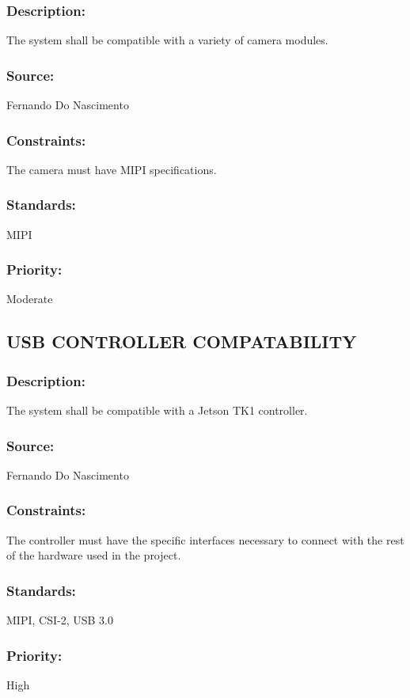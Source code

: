 \subsubsection{Description:} 
	{The system shall be compatible with a variety of camera modules.}
\subsubsection{Source:} 
	{Fernando Do Nascimento}
\subsubsection{Constraints:} 
	{The camera must have MIPI specifications.}
\subsubsection{Standards:} 
	{MIPI}
\subsubsection{Priority:} 
	{Moderate}
\newline
\newline
	
\subsection{\text USB CONTROLLER COMPATABILITY}
\subsubsection{Description:} 
	{The system shall be compatible with a Jetson TK1 controller.}
\subsubsection{Source:} 
	{Fernando Do Nascimento}
\subsubsection{Constraints:} 
	{The controller must have the specific interfaces necessary to connect with the rest of the hardware used in the project.}
\subsubsection{Standards:} 
	{MIPI, CSI-2, USB 3.0}
\subsubsection{Priority:} 
	{High}
\newline
\newline
	
